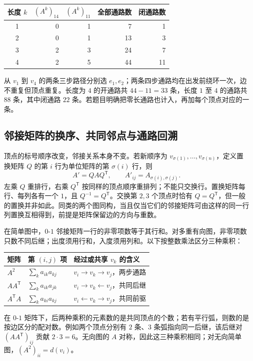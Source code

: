 \documentclass[UTF8,fontset=none,zihao=-4,a4paper]{ctexart}
\begin{document}
\begin{center}
\begin{tabular}{c r r r r}
\toprule 长度 $k$ & $(A^k)_{14}$ & $(A^k)_{11}$ & 全部通路数 & 闭通路数\\\midrule
1&0&1&7&1\\
2&0&1&13&3\\
3&2&3&24&7\\
4&2&5&44&11\\\bottomrule
\end{tabular}
\end{center}
从 $v_1$ 到 $v_4$ 的两条三步路径分别选 $e_1,e_2$；两条四步通路均在出发前绕环一次，边不重复但顶点重复。长度为 $4$ 的开通路共 $44-11=33$ 条，长度 $1$ 至 $4$ 的通路共 $88$ 条，其中闭通路 $22$ 条。若题目明确把零长通路也计入，再加每个顶点对应的一条。

\subsection{邻接矩阵的换序、共同邻点与通路回溯}
顶点的标号顺序改变，邻接关系本身不变。若新顺序为 $v_{\sigma(1)},\ldots,v_{\sigma(n)}$，定义置换矩阵 $Q$ 的第 $i$ 行为单位矩阵的第 $\sigma(i)$ 行，则
\[
A'=QAQ^{\mathsf T},\qquad A'_{ij}=A_{\sigma(i),\sigma(j)}.
\]
左乘 $Q$ 重排行，右乘 $Q^{\mathsf T}$ 按同样的顶点顺序重排列；不能只交换行。置换矩阵每行、每列各有一个 $1$，且 $Q^{-1}=Q^{\mathsf T}$。交换第 $2,3$ 个顶点时恰有 $Q=Q^{\mathsf T}$，但一般的置换并非如此。同类的两个图同构，当且仅当它们的邻接矩阵可由这样的同一行列置换互相得到，前提是矩阵保留边的方向与重数。

在简单图中，$0$-$1$ 邻接矩阵一行的非零项数等于其行和。对多重有向图，非零项数只数不同后继；出度须用行和，入度须用列和。以下按整数乘法区分三种乘积：
\begin{center}
\begin{tabularx}{\linewidth}{l l Y}
\toprule 矩阵 & 第 $(i,j)$ 项 & 经过或共享 $v_k$ 的含义\\\midrule
$A^2$ & $\sum_k a_{ik}a_{kj}$ & $v_i\to v_k\to v_j$，两步通路\\
$AA^{\mathsf T}$ & $\sum_k a_{ik}a_{jk}$ & $v_i\to v_k\leftarrow v_j$，共同后继\\
$A^{\mathsf T}A$ & $\sum_k a_{ki}a_{kj}$ & $v_i\leftarrow v_k\to v_j$，共同前驱\\\bottomrule
\end{tabularx}
\end{center}
在 $0$-$1$ 矩阵下，后两种乘积的元素数的是共同顶点的个数；若有平行弧，则数的是按边区分的配对数。例如两个顶点分别有 $2$ 条、$3$ 条弧指向同一后继，该后继对 $(AA^{\mathsf T})_{ij}$ 贡献 $2\cdot3=6$。无向图的 $A$ 对称，因此这三种乘积相同；对无向简单图，$(A^2)_{ii}=d(v_i)$。
\end{document}
